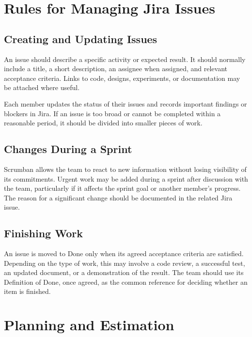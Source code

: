 \documentclass[12pt,a4paper]{article}
\begin{document}
\section{Rules for Managing Jira Issues}

\subsection{Creating and Updating Issues}

An issue should describe a specific activity or expected result. It
should normally include a title, a short description, an assignee when
assigned, and relevant acceptance criteria. Links to code, designs,
experiments, or documentation may be attached where useful.

Each member updates the status of their issues and records important
findings or blockers in Jira. If an issue is too broad or cannot be
completed within a reasonable period, it should be divided into smaller
pieces of work.

\subsection{Changes During a Sprint}

Scrumban allows the team to react to new information without losing
visibility of its commitments. Urgent work may be added during a sprint
after discussion with the team, particularly if it affects the sprint
goal or another member's progress. The reason for a significant change
should be documented in the related Jira issue.

\subsection{Finishing Work}

An issue is moved to Done only when its agreed acceptance criteria are
satisfied. Depending on the type of work, this may involve a code review,
a successful test, an updated document, or a demonstration of the result.
The team should use its Definition of Done, once agreed, as the common
reference for deciding whether an item is finished.


\section{Planning and Estimation}
\end{document}
